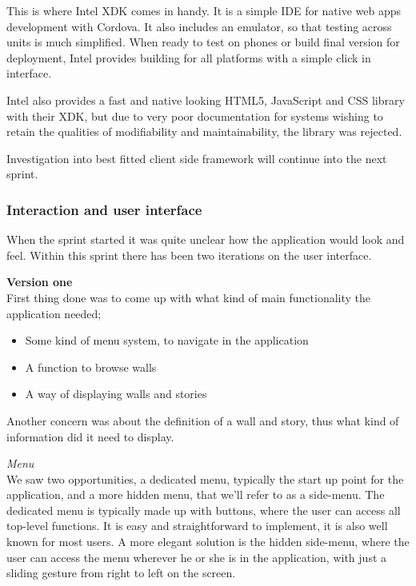 \documentclass[11pt]{book}
\begin{document}
This is where Intel XDK comes in handy. It is a simple IDE for native web apps development with Cordova. It also includes an emulator, so that testing across units is much simplified. When ready to test on phones or build final version for deployment, Intel provides building for all platforms with a simple click in interface.

Intel also provides a fast and native looking HTML5, JavaScript and CSS library with their XDK, but due to very poor documentation for systems wishing to retain the qualities of modifiability and maintainability, the library was rejected.

Investigation into best fitted client side framework will continue into the next sprint.

\subsubsection{Interaction and user interface}
When the sprint started it was quite unclear how the application would look and feel. Within this sprint there has been two iterations on the user interface.

\textbf{Version one}\\
First thing done was to come up with what kind of main functionality the application needed;

\begin{itemize}
\item Some kind of menu system, to navigate in the application
\item A function to browse walls
\item A way of displaying walls and stories
\end{itemize}

Another concern was about the definition of a wall and story, thus what kind of information did it need to display.

\textit{Menu}\\
We saw two opportunities, a dedicated menu, typically the start up point for the application, and a more hidden menu, that we'll refer to as a side-menu. The dedicated menu is typically made up with buttons, where the user can access all top-level functions. It is easy and straightforward to implement, it is also well known for most users. A more elegant solution is the hidden side-menu, where the user can access the menu wherever he or she is in the application, with just a sliding gesture from right to left on the screen.
\end{document}
